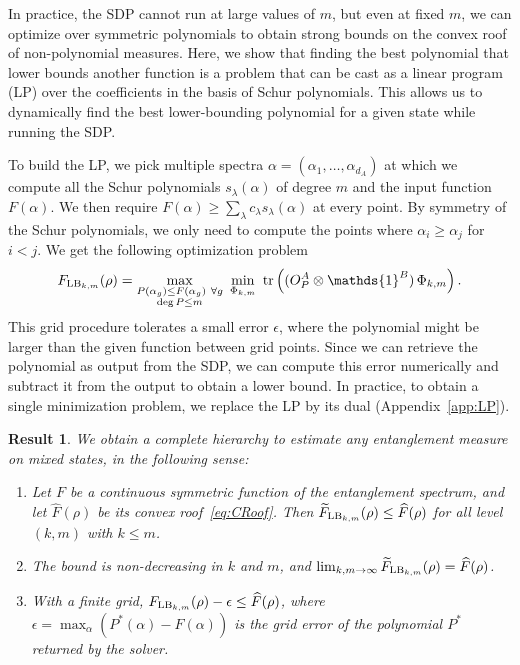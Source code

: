 \documentclass[aps,pra,twocolumn,showpacs,superscriptaddress,groupedaddress]{revtex4-2}
\newcommand{\one}[0]{\mathds{1}}
\renewcommand{\a}{\alpha}
\newcommand{\I}{\one}
\newtheorem{result}    [theorem]{Result}
\begin{document}
In practice, the SDP cannot run at large values of $m$, but even at fixed $m$, we can optimize over symmetric polynomials to obtain strong bounds on the convex roof of non-polynomial measures. Here, we show that finding the best polynomial that lower bounds another function is a problem that can be cast as a linear program (LP) over the coefficients in the basis of Schur polynomials. This allows us to dynamically find the best lower-bounding polynomial for a given state while running the SDP.

To build the LP, we pick multiple spectra $\a=(\a_1, \dots, \a_{d_A})$ at which we compute all the Schur polynomials $s_\lambda(\a)$ of degree $m$ and the input function $F(\a)$. We then require $F(\a) \geq \sum_\lambda c_\lambda s_\lambda(\a)$ at every point. By symmetry of the Schur polynomials, we only need to compute the points where $\a_i \geq \a_j$ for $i < j$.
We get the following optimization problem
\begin{equation}\label{eq:FLBgrid}
    F_{{\rm LB}_{k,m}}(\rho)=\max_{\substack{P(\a_g)\leq F(\a_g)\ \forall g\\ \deg P\leq m}}\ \min_{\Phi_{k,m}}\ \tr\left((O_P^A\otimes\I^B)\,\Phi_{k,m}\right).
\end{equation}
This grid procedure tolerates a small error $\epsilon$, where the polynomial might be larger than the given function between grid points. Since we can retrieve the polynomial as output from the SDP, we can compute this error numerically and subtract it from the output to obtain a lower bound. In practice, to obtain a single minimization problem, we replace the LP by its dual (Appendix~\ref{app:LP}).
\begin{result}\label{thm:non-polyHier} We obtain a complete hierarchy to estimate any entanglement measure on mixed states, in the following sense:
\begin{enumerate}
    \item Let $F$ be a continuous symmetric function of the entanglement spectrum, and let $\widehat{F}(\rho)$ be its convex roof~\eqref{eq:CRoof}. Then $\widetilde F_{{\rm LB}_{k,m}}(\rho)\leq\widehat F(\rho)$ for all level $(k,m)$ with $k\leq m$.
    \item The bound is non-decreasing in $k$ and $m$, and $\lim_{k,m\to\infty}\widetilde F_{{\rm LB}_{k,m}}(\rho)=\widehat F(\rho)$. 
    \item With a finite grid, $F_{{\rm LB}_{k,m}}(\rho)-\epsilon\leq\widehat F(\rho)$, where $\epsilon=\max_\a\left(P^*(\a)-F(\a)\right)$ is the grid error of the polynomial $P^*$ returned by the solver.
\end{enumerate}
\end{result}
\end{document}
